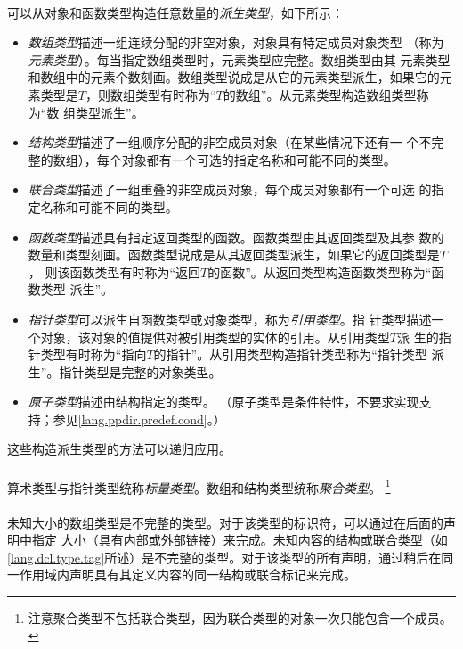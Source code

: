 {\paragraph{}
可以从对象和函数类型构造任意数量的\textit{派生类型}，如下所示：
\begin{itemize}
  \item{\textit{数组类型}描述一组连续分配的非空对象，对象具有特定成员对象类型
    （称为\textit{元素类型}）。每当指定数组类型时，元素类型应完整。数组类型由其
    元素类型和数组中的元素个数刻画。数组类型说成是从它的元素类型派生，如果它的元
    素类型是$T$，则数组类型有时称为``$T$的数组''。从元素类型构造数组类型称为``数
    组类型派生''。}
  \item{\textit{结构类型}描述了一组顺序分配的非空成员对象（在某些情况下还有一
    个不完整的数组），每个对象都有一个可选的指定名称和可能不同的类型。}
  \item{\textit{联合类型}描述了一组重叠的非空成员对象，每个成员对象都有一个可选
    的指定名称和可能不同的类型。}
  \item{\textit{函数类型}描述具有指定返回类型的函数。函数类型由其返回类型及其参
    数的数量和类型刻画。函数类型说成是从其返回类型派生，如果它的返回类型是$T$，
    则该函数类型有时称为``返回$T$的函数''。从返回类型构造函数类型称为``函数类型
    派生''。}
  \item{\textit{指针类型}可以派生自函数类型或对象类型，称为\textit{引用类型}。指
    针类型描述一个对象，该对象的值提供对被引用类型的实体的引用。从引用类型$T$派
    生的指针类型有时称为``指向$T$的指针''。从引用类型构造指针类型称为``指针类型
    派生''。指针类型是完整的对象类型。}
  \item{\textit{原子类型}描述由结构指定的类型。
    （原子类型是条件特性，不要求实现支持；参见\ref{lang.ppdir.predef.cond}。）}
\end{itemize}
这些构造派生类型的方法可以递归应用。

\paragraph{}
算术类型与指针类型统称\textit{标量类型}。数组和结构类型统称\textit{聚合类型}。
\footnote{注意聚合类型不包括联合类型，因为联合类型的对象一次只能包含一个成员。}

\paragraph{}
未知大小的数组类型是不完整的类型。对于该类型的标识符，可以通过在后面的声明中指定
大小（具有内部或外部链接）来完成。未知内容的结构或联合类型（如
\ref{lang.dcl.type.tag}所述）是不完整的类型。对于该类型的所有声明，通过稍后在同
一作用域内声明具有其定义内容的同一结构或联合标记来完成。

}
